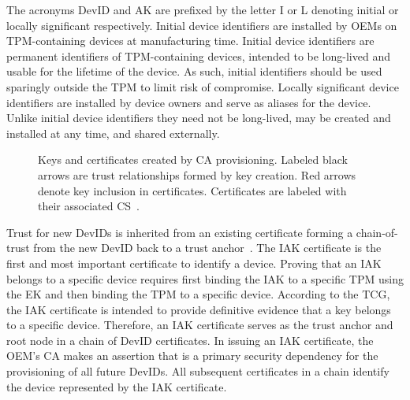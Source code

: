 \documentclass[runningheads]{llncs}
\begin{document}
The acronyms DevID and AK are prefixed by the letter I or L denoting
initial or locally significant respectively.  Initial device
identifiers are installed by OEMs on TPM-containing devices at
manufacturing time.  Initial device identifiers are permanent
identifiers of TPM-containing devices, intended to be long-lived and
usable for the lifetime of the device. As such, initial identifiers
should be used sparingly outside the TPM to limit risk of compromise.
Locally significant device identifiers are installed by device owners
and serve as aliases for the device. Unlike initial device identifiers
they need not be long-lived, may be created and installed at any time,
and shared externally.


\begin{figure}[hbtp]
  \centering
  
  \caption{Keys and certificates created by CA provisioning. Labeled
    black arrows are trust relationships formed by key creation.  Red
    arrows denote key inclusion in certificates. Certificates are
    labeled with their associated CS~\citep{DevIDSpec-TCG}.}
  \label{fig:cert_rel}
\end{figure}

Trust for new DevIDs is inherited from an existing certificate forming
a chain-of-trust from the new DevID back to a trust
anchor~\citep{DevIDSpec-TCG}. The IAK certificate is the first and
most important certificate to identify a device.  Proving that an IAK
belongs to a specific device requires first binding the IAK to a
specific TPM using the EK and then binding the TPM to a specific
device. According to the TCG, the IAK certificate is intended to
provide definitive evidence that a key belongs to a specific
device. Therefore, an IAK certificate serves as the trust anchor and
root node in a chain of DevID certificates.  In issuing an IAK
certificate, the OEM’s CA makes an assertion that is a primary
security dependency for the provisioning of all future DevIDs.  All
subsequent certificates in a chain identify the device represented by
the IAK certificate.
\end{document}
